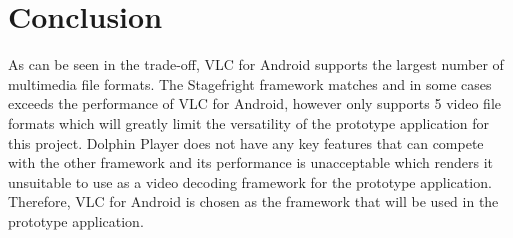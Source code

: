 \section{Conclusion}
As can be seen in the trade-off, VLC for Android supports the largest number of multimedia file formats. The Stagefright framework matches and in some cases exceeds the performance of VLC for Android, however only supports 5 video file formats which will greatly limit the versatility of the prototype application for this project. Dolphin Player does not have any key features that can compete with the other framework and its performance is unacceptable which renders it unsuitable to use as a video decoding framework for the prototype application. Therefore, VLC for Android is chosen as the framework that will be used in the prototype application.
